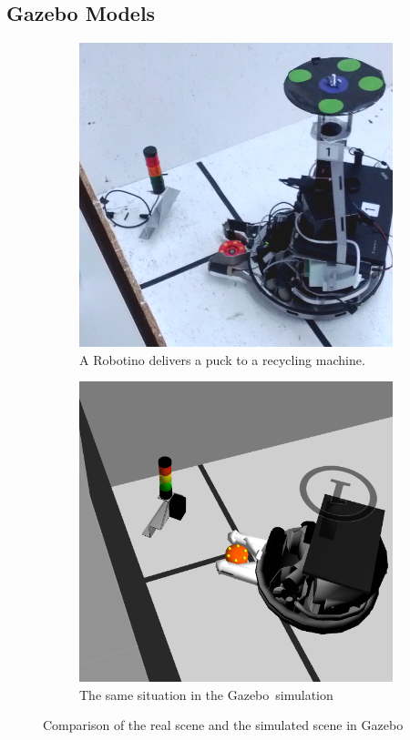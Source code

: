 \subsection{Gazebo Models}
\begin{figure}
\centering
\begin{subfigure}[b]{0.48\textwidth}
\includegraphics[width=\textwidth]{pics/llsf_real}
\caption{A Robotino delivers a puck to a recycling machine.}
\label{fig:comparison_real}
\end{subfigure}
\begin{subfigure}[b]{0.48\textwidth}
\includegraphics[width=\textwidth]{pics/llsf_sim}
\caption{The same situation in the Gazebo~simulation}
\label{fig:comparison_sim}
\end{subfigure}
\caption{Comparison of the real scene and the simulated scene in Gazebo}
\label{fig:comparison}
\end{figure}

